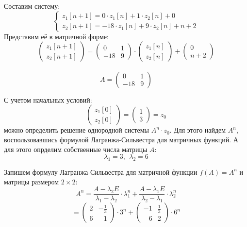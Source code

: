 Составим систему:
\begin{displaymath}
\begin{cases}
z_1[n+1] = 0 \cdot z_1[n] + 1 \cdot z_2[n] + 0
\\
z_2[n+1] = - 18 \cdot z_1[n] + 9 \cdot z_2[n] + n + 2
\end{cases}
\end{displaymath}
Представим её в матричной форме:
\begin{displaymath}
\begin{pmatrix}
z_1[n+1]
\\
z_2[n+1]
\end{pmatrix} = \begin{pmatrix}
0 & 1
\\
-18 & 9
\end{pmatrix} \cdot \begin{pmatrix}
z_1[n]
\\
z_2[n]
\end{pmatrix} + \begin{pmatrix}
0
\\
n + 2
\end{pmatrix}
\end{displaymath}\\[1mm]
\begin{displaymath}
A = \begin{pmatrix}
0 & 1
\\
-18 & 9
\end{pmatrix}
\end{displaymath}

С учетом начальных условий:
\begin{displaymath}
\begin{pmatrix}
z_1[0]
\\
z_2[0]
\end{pmatrix}
=
\begin{pmatrix}
1
\\
3
\end{pmatrix}
=
z_0
\end{displaymath}
можно определить решение однородной системы $A^n \cdot z_0$. Для этого найдем $A^n$, воспользовавшись формулой Лагранжа-Сильвестра для матричных функций. А для этого опрделим собственные числа матрицы $A$:
\begin{displaymath}
\lambda_1 = 3,\ \ \lambda_2 = 6
\end{displaymath}

Запишем формулу Лагранжа-Сильвестра для матричной функции $f(A) = A^n$ и матрицы размером $2 \times 2$:
\begin{displaymath}
A^n = \frac{A - \lambda_2 E}{\lambda_1 - \lambda_2} \cdot \lambda_1^n + \frac{A - \lambda_1 E}{\lambda_2 - \lambda_1} \cdot \lambda_2^n
\end{displaymath}
\begin{displaymath}
= \begin{pmatrix}
2 & - \frac{1}{3}
\\
6 & -1
\end{pmatrix} \cdot 3^n + \begin{pmatrix}
-1 & \frac{1}{3}
\\
-6 & 2
\end{pmatrix} \cdot 6^n
\end{displaymath}

